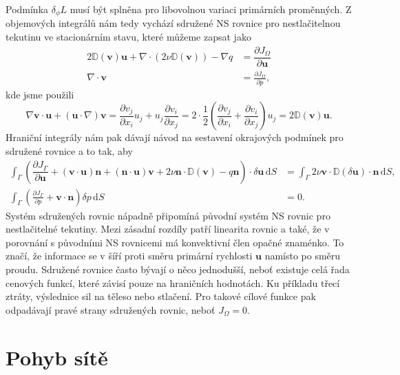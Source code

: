 Podmínka $ \delta_\phi L $ musí být splněna pro libovolnou variaci primárních proměnných. Z objemových integrálů nám tedy vychází sdružené NS rovnice pro nestlačitelnou tekutinu ve stacionárním stavu, které můžeme zapsat jako
\begin{align}
2\mathbb{D}(\mathbf{v})\mathbf{u}
+ \nabla \cdot \left( 2\nu \mathbb{D}(\mathbf{v}) \right)
- \nabla q 
&=
\dfrac{\partial J_{\Omega}}{\partial \mathbf{u}} 
\\
\nabla \cdot \mathbf{v} 
&= 
\frac{\partial J_\Omega}{\partial p},
\end{align}
kde jsme použili  
\begin{equation*}
\nabla \mathbf{v}\cdot \mathbf{u}
+ (\mathbf{u} \cdot \nabla)\mathbf{v} 
=
\frac{\partial v_j}{\partial x_i}  u_j + u_j  \frac{\partial v_i}{\partial x_j} 
=
2\cdot\frac{1}{2}
\left(
\frac{\partial v_j}{\partial x_i}
+ \frac{\partial v_i}{\partial x_j} 
\right)
u_j
=
2\mathbb{D}(\mathbf{v})\mathbf{u}.
\end{equation*}
Hraniční integrály nám pak dávají návod na sestavení okrajových podmínek pro sdružené rovnice a to tak, aby
\begin{align}
\label{eq:sdruzenaOP1}
\int_{\Gamma}
\left(
\dfrac{\partial J_{\Gamma}}{\partial \mathbf{u}}
+ (\mathbf{v}\cdot \mathbf{u} )\mathbf{n} 
+ (\mathbf{n} \cdot \mathbf{u}) \mathbf{v}
+ 2\nu \mathbf{n} \cdot  \mathbb{D}(\mathbf{v})
- q \mathbf{n}
\right)
\cdot \delta \mathbf{u}
\, \mathrm{d}S
&= 
\int_{\Gamma} 
2\nu \mathbf{v} \cdot  \mathbb{D}(\delta \mathbf{u})\cdot \mathbf{n}
\, \mathrm{d}S,
\\
\label{eq:sdruzenaOP2}
\int_{\Gamma}
\left(
\frac{\partial J_\Gamma}{\partial p}
+ \mathbf{v} \cdot \mathbf{n}
\right)
\delta p
\, \mathrm{d}S
&= 0.
\end{align}
Systém sdružených rovnic nápadně připomíná původní systém NS rovnic pro nestlačitelné tekutiny. Mezi zásadní rozdíly patří linearita rovnic a také, že v porovnání s původními NS rovnicemi má konvektivní člen opačné znaménko. To značí, že informace se v šíří proti směru primární rychlosti $ \mathbf{u} $ namísto po směru proudu. Sdružené rovnice často bývají o něco jednodušší, neboť existuje celá řada cenových funkcí, které závisí pouze na hraničních hodnotách. Ku příkladu třecí ztráty, výslednice sil na těleso nebo stlačení. Pro takové cílové funkce pak odpadávají pravé strany sdružených rovnic, neboť $ J_\Omega = 0 $.


\section{Pohyb sítě}

